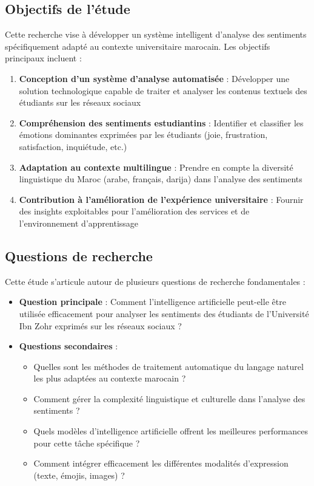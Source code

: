 \subsection{Objectifs de l'étude}

Cette recherche vise à développer un système intelligent d'analyse des sentiments spécifiquement adapté au contexte universitaire marocain. Les objectifs principaux incluent :

\begin{enumerate}
    \item \textbf{Conception d'un système d'analyse automatisée} : Développer une solution technologique capable de traiter et analyser les contenus textuels des étudiants sur les réseaux sociaux
    \item \textbf{Compréhension des sentiments estudiantins} : Identifier et classifier les émotions dominantes exprimées par les étudiants (joie, frustration, satisfaction, inquiétude, etc.)
    \item \textbf{Adaptation au contexte multilingue} : Prendre en compte la diversité linguistique du Maroc (arabe, français, darija) dans l'analyse des sentiments
    \item \textbf{Contribution à l'amélioration de l'expérience universitaire} : Fournir des insights exploitables pour l'amélioration des services et de l'environnement d'apprentissage
\end{enumerate}

\subsection{Questions de recherche}

Cette étude s'articule autour de plusieurs questions de recherche fondamentales :

\begin{itemize}
    \item \textbf{Question principale} : Comment l'intelligence artificielle peut-elle être utilisée efficacement pour analyser les sentiments des étudiants de l'Université Ibn Zohr exprimés sur les réseaux sociaux ?
    \item \textbf{Questions secondaires} :
    \begin{itemize}
        \item Quelles sont les méthodes de traitement automatique du langage naturel les plus adaptées au contexte marocain ?
        \item Comment gérer la complexité linguistique et culturelle dans l'analyse des sentiments ?
        \item Quels modèles d'intelligence artificielle offrent les meilleures performances pour cette tâche spécifique ?
        \item Comment intégrer efficacement les différentes modalités d'expression (texte, émojis, images) ?
    \end{itemize}
\end{itemize}

